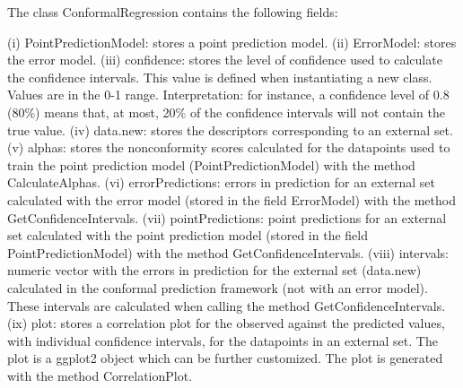 \documentclass[a4paper]{book}
\begin{document}
\begin{Details}\relax
The class ConformalRegression contains the following fields:

(i) PointPredictionModel: stores a point prediction model.
(ii) ErrorModel: stores the error model.
(iii) confidence: stores the level of confidence used to calculate the confidence intervals. This value is defined when instantiating a new class. Values are in the 0-1 range. 
Interpretation: for instance, a confidence level of 0.8 (80\%) means that, at most, 20\% of the confidence intervals will not contain the 
true value.
(iv) data.new: stores the descriptors corresponding to an external set.
(v)  alphas: stores the nonconformity scores calculated for the datapoints used to train the point prediction model (PointPredictionModel) with the method CalculateAlphas.
(vi)  errorPredictions: errors in prediction for an external set calculated with the error model (stored in the field ErrorModel) with the method GetConfidenceIntervals.
(vii) pointPredictions: point predictions for an external set calculated with the point prediction model (stored in the field PointPredictionModel) with the method GetConfidenceIntervals.
(viii)  intervals: numeric vector with the errors in prediction for the external set (data.new) calculated in the conformal prediction framework (not with an error model).
These intervals are calculated when calling the method GetConfidenceIntervals.
(ix) plot: stores a correlation plot for the observed against the predicted values, with individual confidence intervals, for the datapoints in an external set. The plot is a ggplot2 object which can be further customized. The plot is generated with the method CorrelationPlot.


\end{Details}
\end{document}
